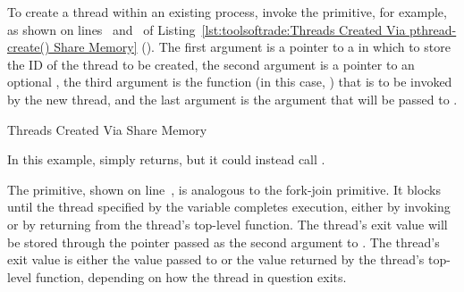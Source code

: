 \begin{fcvref}
To create a thread within an existing process, invoke the
 primitive, for example, as shown on
lines~ and~ of
Listing~\ref{lst:toolsoftrade:Threads Created Via pthread-create() Share Memory}
().
The first argument is a pointer to a  in which to store the
ID of the thread to be created, the second  argument is a pointer
to an optional , the third argument is the function
(in this case, )
that is to be invoked by the new thread, and the last  argument
is the argument that will be passed to .
\end{fcvref}

\begin{listing}[tbp]

\caption{Threads Created Via  Share Memory}
\label{lst:toolsoftrade:Threads Created Via pthread-create() Share Memory}
\end{listing}

In this example,  simply returns, but it could instead
call .

\QuickQuizEnd

\begin{fcvref}
The  primitive, shown on line~,
is analogous to
the fork-join  primitive.
It blocks until the thread specified by the  variable completes
execution, either by invoking  or by returning from
the thread's top-level function.
The thread's exit value will be stored through the pointer passed as the
second argument to .
The thread's exit value is either the value passed to 
or the value returned by the thread's top-level function, depending on
how the thread in question exits.
\end{fcvref}

